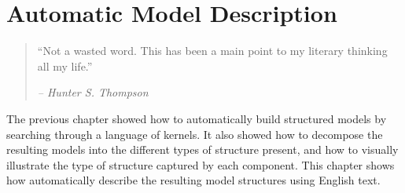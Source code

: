 
\inbpdocument


\chapter{Automatic Model Description}
\label{ch:description}












\begin{quotation}
``Not a wasted word.
This has been a main point to my literary thinking all my life.''

\hspace*{\fill} \emph{ -- Hunter S. Thompson}
\end{quotation}



The previous chapter showed how to automatically build structured models by searching through a language of kernels.
It also showed how to decompose the resulting models into the different types of structure present, and how to visually illustrate the type of structure captured by each component.
This chapter shows how automatically describe the resulting model structures using English text.

